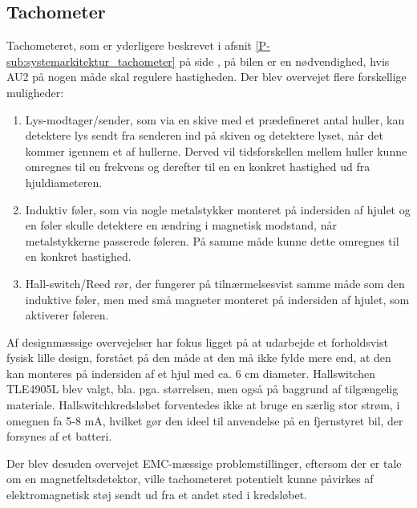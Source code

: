 \subsection{Tachometer}

Tachometeret, som er yderligere beskrevet i afsnit \ref{P-sub:systemarkitektur_tachometer}  på side \pageref{P-sub:systemarkitektur_tachometer}, på bilen er en nødvendighed, hvis AU2 på nogen måde skal regulere hastigheden. Der blev overvejet flere forskellige muligheder:
\begin{enumerate}
	\item Lys-modtager/sender, som via en skive med et prædefineret antal huller, kan detektere lys sendt fra senderen ind på skiven og detektere lyset, når det kommer igennem et af hullerne. Derved vil tidsforskellen mellem huller kunne omregnes til en frekvens og derefter til en en konkret hastighed ud fra hjuldiameteren.
	\item Induktiv føler, som via nogle metalstykker monteret på indersiden af hjulet og en føler skulle detektere en ændring i magnetisk modstand, når metalstykkerne passerede føleren. På samme måde kunne dette omregnes til en konkret hastighed.
	\item Hall-switch/Reed rør, der fungerer på tilnærmelsesvist samme måde som den induktive føler, men med små magneter monteret på indersiden af hjulet, som aktiverer føleren.
\end{enumerate}

Af designmæssige overvejelser har fokus ligget på at udarbejde et forholdsvist fysisk lille design, forstået på den måde at den må ikke fylde mere end, at den kan monteres på indersiden af et hjul med ca. 6 cm diameter.
Hallswitchen TLE4905L \cite{lib:tacho} blev valgt, bla. pga. størrelsen, men også på baggrund af tilgængelig materiale. Hallswitchkredsløbet forventedes ikke at bruge en særlig stor strøm, i omegnen fa 5-8 mA, hvilket gør den ideel til anvendelse på en fjernstyret bil, der forsynes af et batteri. 

Der blev desuden overvejet EMC-mæssige problemstillinger, eftersom der er tale om en magnetfeltsdetektor, ville tachometeret potentielt kunne påvirkes af elektromagnetisk støj sendt ud fra et andet sted i kredsløbet.

